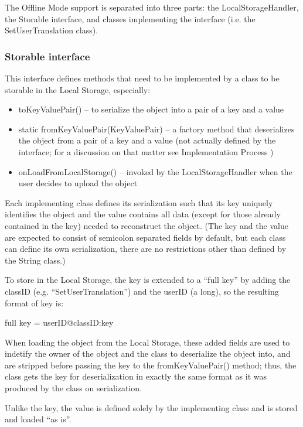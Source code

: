The Offline Mode support is separated into three parts: the LocalStorageHandler, the Storable interface, and classes implementing the interface (i.e. the SetUserTranslation class).

\subsubsection{Storable interface}

This interface defines methods that need to be implemented by a class to be storable in the Local Storage, especially:

\begin{itemize}
\item toKeyValuePair() -- to serialize the object into a pair of a key and a value

\item static fromKeyValuePair(KeyValuePair) -- a factory method that deserializes the object from a pair of a key and a value (not actually defined by the interface; for a discussion on that matter see Implementation Process )

\item onLoadFromLocalStorage() -- invoked by the LocalStorageHandler when the user decides to upload the object
\end{itemize}

Each implementing class defines its serialization such that its key uniquely identifies the object and the value contains all data (except for those already contained in the key) needed to reconstruct the object.
(The key and the value are expected to consist of semicolon separated fields by default, but each class can define its own serialization, there are no restrictions other than defined by the String class.)

To store in the Local Storage, the key is extended to a ``full key'' by adding the classID (e.g. ``SetUserTranslation'') and the userID (a long),
so the resulting format of key is:

full key = userID@classID:key

When loading the object from the Local Storage, these added fields are used to indetify the owner of the object and the class to deserialize the object into, and are stripped before passing the key to the fromKeyValuePair() method; thus, the class gets the key for deserialization in exactly the same format as it was produced by the class on serialization.

Unlike the key, the value is defined solely by the implementing class and is stored and loaded ``as is''.

